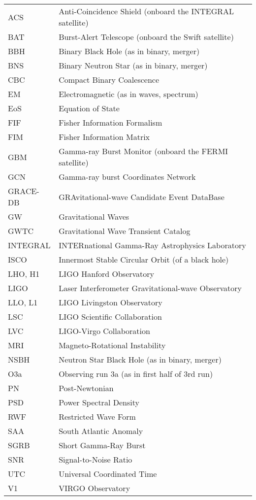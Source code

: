\begin{longtable}[l]{l l}
    ACS & Anti-Coincidence Shield (onboard the INTEGRAL satellite) \\
    BAT & Burst-Alert Telescope (onboard the Swift satellite) \\
    BBH & Binary Black Hole (as in binary, merger) \\
    BNS & Binary Neutron Star (as in binary, merger) \\
    CBC & Compact Binary Coalescence \\
    EM & Electromagnetic (as in waves, spectrum) \\
    EoS & Equation of State \\
    FIF & Fisher Information Formalism \\
    FIM & Fisher Information Matrix \\
    GBM & Gamma-ray Burst Monitor (onboard the FERMI satellite) \\
    GCN & Gamma-ray burst Coordinates Network \\
    GRACE-DB & GRAvitational-wave Candidate Event DataBase \\
    GW & Gravitational Waves \\
    GWTC & Gravitational Wave Transient Catalog \\
    INTEGRAL & INTERnational Gamma-Ray Astrophysics Laboratory \\
    ISCO & Innermost Stable Circular Orbit (of a black hole) \\
    LHO, H1 & LIGO Hanford Observatory \\
    LIGO & Laser Interferometer Gravitational-wave Observatory \\
    LLO, L1 & LIGO Livingston Observatory \\
    LSC & LIGO Scientific Collaboration \\
    LVC & LIGO-Virgo Collaboration \\
    MRI & Magneto-Rotational Instability \\
    NSBH & Neutron Star Black Hole (as in binary, merger) \\
    O3a & Observing run 3a (as in first half of 3rd run) \\
    PN & Post-Newtonian \\
    PSD & Power Spectral Density \\
    RWF & Restricted Wave Form \\
    SAA & South Atlantic Anomaly \\
    SGRB & Short Gamma-Ray Burst \\
    SNR & Signal-to-Noise Ratio \\
    UTC & Universal Coordinated Time \\
    V1 & VIRGO Observatory \\
\end{longtable}

